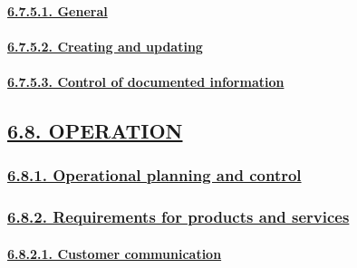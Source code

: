 \documentclass[
]{article}
\begin{document}
\hypertarget{general-3}{%
\paragraph{\texorpdfstring{\protect\hyperlink{general-12}{6.7.5.1.
General}}{6.7.5.1. General}}\label{general-3}}

\hypertarget{creating-and-updating}{%
\paragraph{\texorpdfstring{\protect\hyperlink{creating-and-updating-1}{6.7.5.2.
Creating and
updating}}{6.7.5.2. Creating and updating}}\label{creating-and-updating}}

\hypertarget{control-of-documented-information}{%
\paragraph{\texorpdfstring{\protect\hyperlink{control-of-documented-information-1}{6.7.5.3.
Control of documented
information}}{6.7.5.3. Control of documented information}}\label{control-of-documented-information}}

\hypertarget{operation}{%
\subsection{\texorpdfstring{\protect\hyperlink{operation-1}{6.8.
OPERATION}}{6.8. OPERATION}}\label{operation}}

\hypertarget{operational-planning-and-control}{%
\subsubsection{\texorpdfstring{\protect\hyperlink{operational-planning-and-control-1}{6.8.1.
Operational planning and
control}}{6.8.1. Operational planning and control}}\label{operational-planning-and-control}}

\hypertarget{requirements-for-products-and-services}{%
\subsubsection{\texorpdfstring{\protect\hyperlink{requirements-for-products-and-services-1}{6.8.2.
Requirements for products and
services}}{6.8.2. Requirements for products and services}}\label{requirements-for-products-and-services}}

\hypertarget{customer-communication}{%
\paragraph{\texorpdfstring{\protect\hyperlink{customer-communication-1}{6.8.2.1.
Customer
communication}}{6.8.2.1. Customer communication}}\label{customer-communication}}
\end{document}
